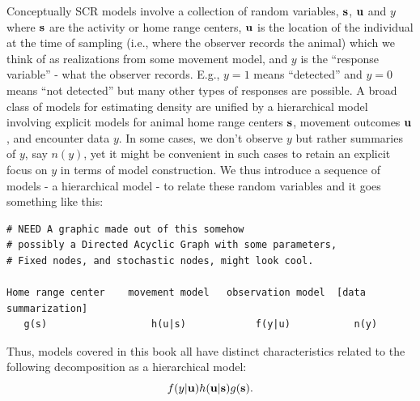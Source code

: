 Conceptually SCR models involve a collection of random
variables, ${\bf s}$, ${\bf u}$ and $y$ where ${\bf s}$ are the
activity or home range centers, ${\bf u}$ is the location of the
individual at the time of sampling (i.e., where the observer records
the animal) which we think of as realizations from some movement
model, and $y$ is the ``response variable'' - what the observer
records. E.g., $y=1$ means ``detected'' and $y=0$ means ``not
detected'' but many other types of responses are possible.
A broad class of models for estimating density are unified by a
hierarchical model involving explicit models for
animal home range centers ${\bf s}$, movement outcomes ${\bf u}$, and
encounter data $y$.  In some cases, we don't observe $y$ but rather
summaries of $y$, say $n(y)$, yet it might be convenient in such cases
to retain an explicit focus on $y$ in terms of model construction.
We thus introduce a sequence of models - a hierarchical model -
to relate these random variables and it goes something like this:
{\small 
\begin{verbatim}
# NEED A graphic made out of this somehow
# possibly a Directed Acyclic Graph with some parameters, 
# Fixed nodes, and stochastic nodes, might look cool. 

Home range center    movement model   observation model  [data summarization]
   g(s)                  h(u|s)            f(y|u)	        n(y)
\end{verbatim}
}
Thus, models covered in this book all have distinct
characteristics related to the following decomposition as a
hierarchical model:
\[
f(y|{\bf u})h({\bf u}|{\bf s})g({\bf s}).
\]


